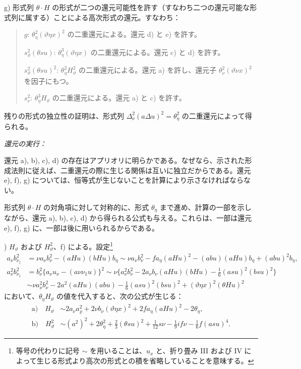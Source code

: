 \documentclass[11pt]{jlreq}
\newcommand{\A}{\Delta}
\newcommand{\R}{\varrho}
\begin{document}
g) 形式列 $\theta\cdot H$ の形式が二つの還元可能性を許す（すなわち二つの還元可能な形式列に属する）ことによる高次形式の還元。すなわち：
\begin{quote}\small
$g$: $\theta_\eta^2(\vartheta\eta x)^2$ の二重還元による。還元 d) と e) を許す。\par
$s_\vartheta^2(\theta su)$: $\theta_\eta^3(\vartheta\eta x)$ の二重還元による。還元 c) と d) を許す。\par
$s_\vartheta^2(\theta su)^2$: $\theta_\eta^2H_\vartheta^2$ の二重還元による。還元 a) を許し、還元子 $\theta_\nu^2(\vartheta\nu x)^2$ を因子にもつ。\par
$s_\nu^2$: $\theta_\eta^3H_\vartheta$ の二重還元による。還元 a) と c) を許す。
\end{quote}
残りの形式の独立性の証明は、形式列 $\A_\nu^2(a\A u)^2=\theta_\eta^2$ の二重還元によって得られる。

\noindent\emph{還元の実行：}

還元 a), b), c), d) の存在はアプリオリに明らかである。なぜなら、示された形成法則に従えば、二重還元の際に生じる関係は互いに独立だからである。還元 e), f), g) については、恒等式が生じないことを計算により示さなければならない。

形式列 $\theta\cdot H$ の対角項に対して対称的に、形式 $\theta_\eta$ まで進め、計算の一部を示しながら、還元 a), b), c), d) から得られる公式も与える。これらは、一部は還元 e), f), g) に、一部は後に用いられるからである。

) $H_\vartheta$ および $H_\vartheta^2$、f) による。設定\footnote{等号の代わりに記号 $\sim$ を用いることは、$u_x$ と、折り畳み III および IV によって生じる形式より高次の形式との積を省略していることを意味する。}
\[
\begin{aligned}
a_\nu b_{\nu_1}^2
&=\nu a_\nu b_\nu^2-(aHu)(bHu)b_\eta
\sim \nu a_\nu b_\nu^2-f a_\eta(aHu)^2-(abu)(aHu)b_\eta+(abu)^2b_\eta,\\
a_\nu^2b_{\nu_1}^2
&=b_\nu^2\{a_\nu u_\nu-(a\nu\nu_1u)\}^2
\sim \nu\{a_\nu^2b_\nu^2-2a_\nu b_\nu(aHu)(bHu)
-\frac16(asu)^2(bsu)^2\}\\
&\sim \nu a_\nu^2b_\nu^2-2a^2(aHu)(abu)-\frac16(asu)^2(bsu)^2+(\vartheta\eta x)^2(\theta Hu)^2
\end{aligned}
\]
において、$\theta_\eta H_\vartheta$ の値を代入すると、次の公式が生じる：
\[
\tag{12}
\begin{aligned}
\text{a)}\quad H_\vartheta&\sim 2a_\nu a_\R^2+2\nu b_\nu(\vartheta\eta x)^2+2f a_\eta(aHu)^2-2\theta_\eta,\\
\text{b)}\quad H_\vartheta^2&\sim (a^2)^2+2\theta_\eta^2+\frac23(\theta su)^2
+\frac1{12}s\nu-\frac19if\nu-\frac16f(asu)^4.
\end{aligned}
\]
\end{document}
